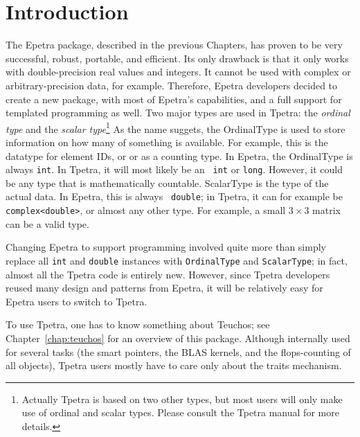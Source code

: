\section{Introduction}
\label{sec:tpetra_introduction}

The Epetra package, described in the previous Chapters, has proven to be very
successful, robust, portable, and efficient. Its only drawback is that it only
works with double-precision real values and integers. It cannot be used with
complex or arbitrary-precision data, for example. Therefore, Epetra developers
decided to create a new package, with most of Epetra's capabilities, and a
full support for templated programming as well. Two major types are used in
Tpetra: the {\sl ordinal type} and the {\sl scalar type}\footnote{Actually
Tpetra is based on two other types, but most users will only make  use of
ordinal and scalar types. Please consult the Tpetra manual for more
details.} As the 
name suggets, the OrdinalType is used to store information on how many of
something is available. For example,
this is the datatype for element IDs, or or as a counting type. In Epetra, the
  OrdinalType is always {\tt int}. In Tpetra, it will most likely be an {\tt
    int} or {\tt long}. However, it could be any type that is mathematically
    countable.
ScalarType is the type of the actual data. In Epetra, this is always {\tt
  double}; in Tpetra, it can for example be {\tt complex<double>}, or almost
  any other type. For example, a small $3 \times 3$ matrix can be a valid
  type.

\begin{remark}
Changing Epetra to support programming involved quite more than
simply replace all {\tt int} and {\tt double} instances with {\tt OrdinalType}
and {\tt ScalarType}; in fact, almost all the Tpetra code is entirely new.
However, since Tpetra developers reused many design and patterns from Epetra,
  it will be relatively easy for Epetra users to switch to Tpetra.
\end{remark}

To use Tpetra, one has to know something about Teuchos; see
Chapter~\ref{chap:teuchos} for an overview of this package. Although
internally used for several tasks (the smart pointers, the BLAS kernels, and
the flops-counting of all objects), Tpetra users mostly have to
care only about the traits mechanism.

